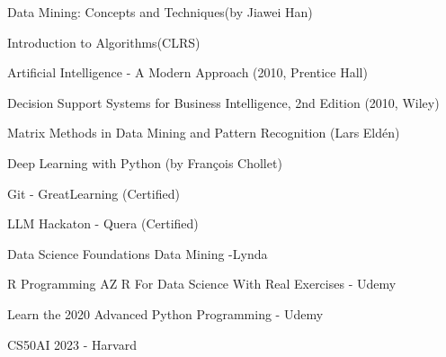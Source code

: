 \documentclass[a4paper]{deedy-resume} %
\begin{document}
\begin{minipage}[t]{0.66\textwidth}
\descript{ }


\vspace{\topsep} %
\begin{tightitemize}
\item Data Mining: Concepts and Techniques(by Jiawei Han)
\item Introduction to Algorithms(CLRS)
\item Artificial Intelligence - A Modern Approach (2010, Prentice Hall) 
\item Decision Support Systems for Business Intelligence, 2nd Edition (2010, Wiley)
\item Matrix Methods in Data Mining and Pattern Recognition (Lars Eldén)
\item Deep Learning with Python (by François Chollet)
\end{tightitemize}
\vspace{\topsep} %


\vspace{\topsep} %
\begin{tightitemize}
\item Git - GreatLearning (Certified)
\item LLM Hackaton - Quera (Certified)
\item Data Science Foundations Data Mining -Lynda
\item R Programming AZ R For Data Science With Real Exercises - Udemy
\item Learn the 2020 Advanced Python Programming - Udemy
\item CS50AI 2023 - Harvard 
\end{tightitemize}




\end{minipage} %
\end{document}
